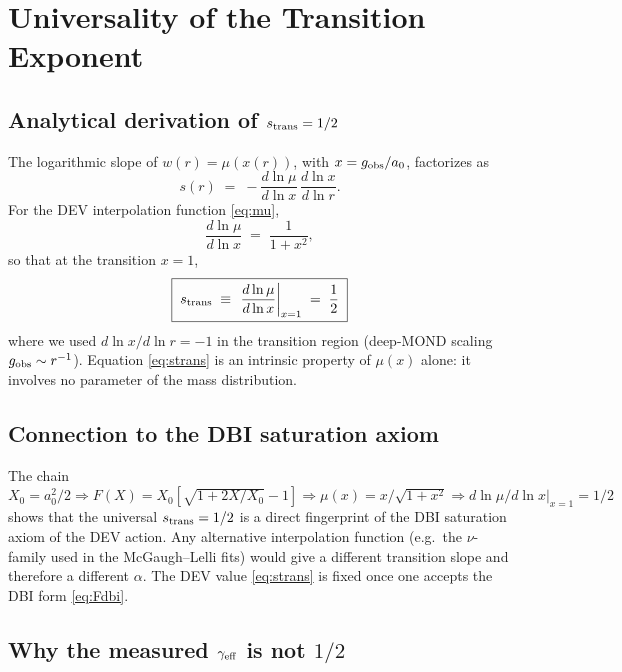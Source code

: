 \documentclass[aps,prd,twocolumn,superscriptaddress,nofootinbib]{revtex4-2}
\begin{document}
\section{Universality of the Transition Exponent}\label{sec:universality}

\subsection{Analytical derivation of $s_{\rm trans} = 1/2$}

The logarithmic slope of $w(r)=\mu(x(r))$, with
$x = g_{\rm obs}/a_0$, factorizes as
\begin{equation}
s(r) \;=\; -\frac{d\ln\mu}{d\ln x}\,\frac{d\ln x}{d\ln r}.
\label{eq:sfactor}
\end{equation}
For the DEV interpolation function \eqref{eq:mu},
\begin{equation}
\frac{d\ln\mu}{d\ln x} \;=\; \frac{1}{1+x^2},
\end{equation}
so that at the transition $x=1$,
\begin{equation}
\boxed{\;s_{\rm trans} \;\equiv\; \left.\frac{d\ln\mu}{d\ln x}
\right|_{x=1} \;=\; \frac{1}{2}\;}
\label{eq:strans}
\end{equation}
where we used $d\ln x/d\ln r = -1$ in the transition region
(deep-MOND scaling $g_{\rm obs}\sim r^{-1}$). Equation
\eqref{eq:strans} is an intrinsic property of $\mu(x)$ alone: it
involves no parameter of the mass distribution.

\subsection{Connection to the DBI saturation axiom}

The chain $X_0 = a_0^2/2 \Rightarrow F(X) = X_0[\sqrt{1+2X/X_0}-1]
\Rightarrow \mu(x) = x/\sqrt{1+x^2} \Rightarrow d\ln\mu/d\ln x|_{x=1}
= 1/2$ shows that the universal $s_{\rm trans} = 1/2$ is a direct
fingerprint of the DBI saturation axiom of the DEV action. Any
alternative interpolation function (e.g.\ the $\nu$-family used in
the McGaugh--Lelli fits) would give a different transition slope
and therefore a different $\alpha$. The DEV value
\eqref{eq:strans} is fixed once one accepts the DBI form
\eqref{eq:Fdbi}.

\subsection{Why the measured $\gamma_{\rm eff}$ is not $1/2$}
\end{document}
